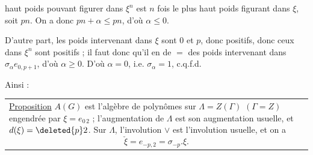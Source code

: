 
haut poids pouvant figurer dans $\xi^n$ est $n$ fois le plus haut poids figurant dans $\xi$, soit $pn$. On a donc $pn+\alpha\leq pn$, d'où $\alpha\leq0$.

D'autre part, les poids intervenant dans $\xi$ sont $0$ et $p$, donc positifs, donc ceux dans $\xi^n$ sont positifs ; il faut donc qu'il \deleted{\unsure{$\alpha$}} en  de $=$ des poids intervenant dans $\sigma_\alpha e_{0,p+1}$, d'où $\alpha\geq0$. D'où $\alpha=0$, i.e. $\sigma_\alpha=1$, c.q.f.d.

Ainsi :

\noindent\begin{tabular}{@{}|p{.92\linewidth}@{}}\uline{Proposition} $A(G)$ est l'algèbre de polynômes sur $\Lambda=Z(\Gamma)$ $(\Gamma=Z)$ engendrée par $\xi=e_{0\,2}$ ; l'augmentation de $\Lambda$ est son augmentation usuelle, et $d(\xi)=\deleted{p}2$. Sur $\Lambda$, l'involution $\vee$ est l'involution usuelle, et on a
\[ \check\xi=e_{-p,2}=\sigma_{-p}.\xi. \]
\end{tabular}

